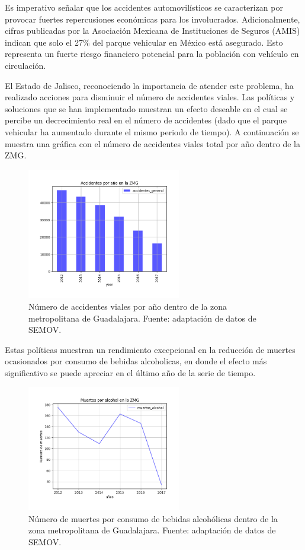 \documentclass{article}
\begin{document}
Es imperativo señalar que los accidentes automovilísticos se caracterizan por provocar fuertes
repercusiones económicas para los involucrados. Adicionalmente, cifras publicadas por la
Asociación Mexicana de Instituciones de Seguros (AMIS) indican que solo el 27\% del parque vehicular en
México está asegurado. Esto representa un fuerte riesgo financiero potencial para la población con
vehículo en circulación.

El Estado de Jalisco, reconociendo la importancia de atender este problema,
ha realizado acciones para disminuir el número de accidentes viales.
Las políticas y soluciones que se han implementado muestran un efecto deseable en el cual
se percibe un decrecimiento real en el número de accidentes (dado que el parque vehicular ha aumentado
durante el mismo periodo de tiempo). A continuación se muestra una gráfica con el número
de accidentes viales total por año dentro de la ZMG.

	\begin{figure}[H]\centering
	\includegraphics[width=0.60\textwidth]{resources/img/accidentes_general_img.png}
	\caption{\label{fig:accidentes_general_img} Número de accidentes viales por año dentro de la zona metropolitana de Guadalajara. Fuente: adaptación de datos de SEMOV.}
    \end{figure}

Estas políticas muestran un rendimiento excepcional en la reducción de muertes ocasionados por consumo de bebidas alcoholicas,
en donde el efecto más significativo se puede apreciar en el último año de la serie de tiempo.


	\begin{figure}[H]\centering
	\includegraphics[width=0.60\textwidth]{resources/img/muertos_alcohol_img.png}
	\caption{\label{fig:muertes_img} Número de muertes por consumo de bebidas alcohólicas dentro de la zona metropolitana de Guadalajara. Fuente: adaptación de datos de SEMOV.}
    \end{figure}
\end{document}

